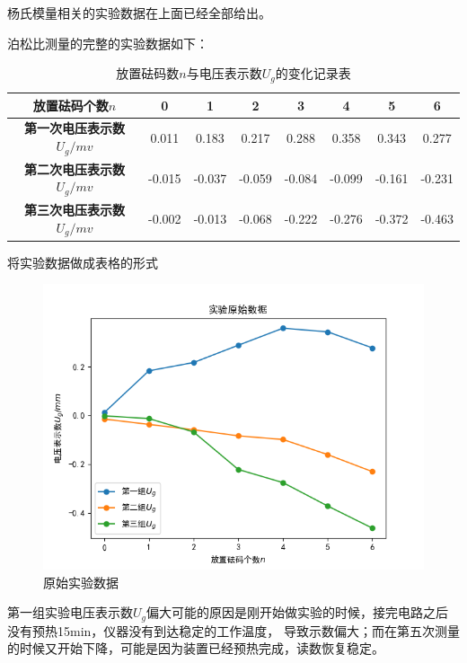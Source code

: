 \documentclass[a4paper,UTF8]{ctexart}
\begin{document}
杨氏模量相关的实验数据在上面已经全部给出。

泊松比测量的完整的实验数据如下：

\begin{table}[!hp]
    \begin{center}
    \begin{tabular}{|c|c|c|c|c|c|c|c|}
    \hline
    \bfseries 放置砝码个数$n$ & 0 & 1 & 2 & 3 & 4 & 5 & 6 \\
    \hline
    \bfseries 第一次电压表示数$U_g/mv$ & 0.011 & 0.183 & 0.217 & 0.288 & 0.358 & 0.343 & 0.277 \\
    \hline
    \bfseries 第二次电压表示数$U_g/mv$ & -0.015 & -0.037 & -0.059 & -0.084 & -0.099 & -0.161 & -0.231\\
    \hline
    \bfseries 第三次电压表示数$U_g/mv$ & -0.002 & -0.013 & -0.068 & -0.222 & -0.276 & -0.372 & -0.463 \\
    \hline
    \end{tabular}
    \end{center}
    \caption{放置砝码数$n$与电压表示数$U_g$的变化记录表}
\end{table}

将实验数据做成表格的形式

\newpage

\begin{figure}[!htb]
    \centering
    \includegraphics[scale=0.5]{Figure_3.png}
    \caption{原始实验数据}
\end{figure}

第一组实验电压表示数$U_g$偏大可能的原因是刚开始做实验的时候，接完电路之后没有预热15min，仪器没有到达稳定的工作温度，
导致示数偏大；而在第五次测量的时候又开始下降，可能是因为装置已经预热完成，读数恢复稳定。
\end{document}
